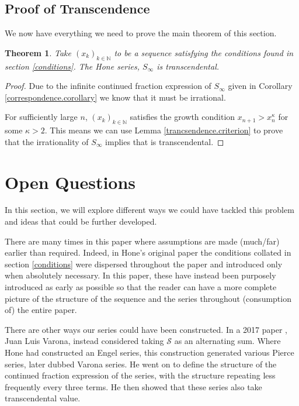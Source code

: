 \documentclass{article}
\newtheorem{theorem}{Theorem}[section]
\theoremstyle{remark}
\theoremstyle{definition}
\begin{document}
\subsection{Proof of Transcendence}
We now have everything we need to prove the main theorem of this section.
\begin{theorem}
Take $(x_k)_{k\in\mathbb{N}}$ to be a sequence satisfying the conditions found in section \ref{conditions}. The Hone series, $S_\infty$ is transcendental.
\end{theorem}
\begin{proof}
Due to the infinite continued fraction expression of $S_\infty$ given in Corollary \ref{correspondence.corollary} we know that it must be irrational. 

For sufficiently large $n$, $(x_k)_{k\in\mathbb{N}}$ satisfies the growth condition $x_{n+1} > x_n^\kappa$ for some $\kappa > 2$. This means we can use Lemma \ref{trancsendence.criterion} to prove that the irrationality of $S_\infty$ implies that is transcendental.
\end{proof}

\section*{Open Questions}
In this section, we will explore different ways we could have tackled this problem and ideas that could be further developed.

There are many times in this paper where assumptions are made (much/far) earlier than required. Indeed, in Hone's original paper the conditions collated in section \ref{conditions} were dispersed throughout the paper and introduced only when absolutely necessary. In this paper, these have instead been purposely introduced as early as possible so that the reader can have a more complete picture of the structure of the sequence and the series throughout (consumption of) the entire paper. 

There are other ways our series could have been constructed. In a 2017 paper \cite{varona2017continued}, Juan Luis Varona, instead considered taking $\mathcal{S}$ as an alternating sum. Where Hone had constructed an Engel series, this construction generated various Pierce series, later dubbed Varona series. He went on to define the structure of the continued fraction expression of the series, with the structure repeating less frequently every three terms. He then showed that these series also take transcendental value.
\end{document}
